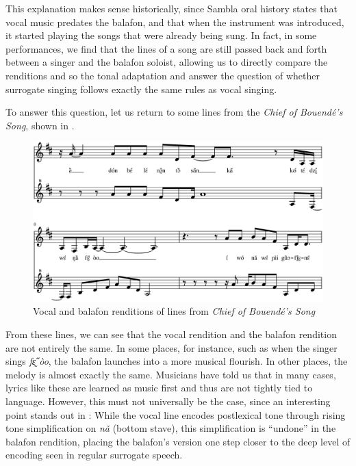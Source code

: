 \documentclass[output=paper]{langscibook}
\begin{document}
This explanation makes sense historically, since Sambla oral history states that vocal music predates the balafon, and that when the instrument was introduced, it started playing the songs that were already being sung. In fact, in some performances, we find that the lines of a song are still passed back and forth between a singer and the balafon soloist, allowing us to directly compare the renditions and so the tonal adaptation and answer the question of whether surrogate singing follows exactly the same rules as vocal singing. 

To answer this question, let us return to some lines from the \textit{Chief of Bouendé's Song}, shown in . 

\begin{figure}
\includegraphics[scale=.37, angle=90]{figures/voice-balafon-comparison.eps}
\caption{Vocal and balafon renditions of lines from \textit{Chief of Bouendé's Song}\label{fig:mcpherson:Bouende}} 
\end{figure}

From these lines, we can see that the vocal rendition and the balafon rendition are not entirely the same. In some places, for instance, such as when the singer sings \textit{fɛ̰̋ òo}, the balafon launches into a more musical flourish. In other places, the melody is almost exactly the same. Musicians have told us that in many cases, lyrics like these are learned as music first and thus are not tightly tied to language. However, this must not universally be the case, since an interesting point stands out in : While the vocal line encodes postlexical tone through rising tone simplification on \textit{nǎ} (bottom stave), this simplification is ``undone'' in the balafon rendition, placing the balafon's version one step closer to the deep level of encoding seen in regular surrogate speech. 
\end{document}

